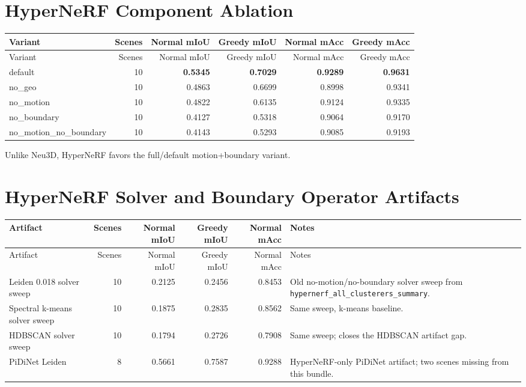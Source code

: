 \documentclass[10pt]{article}
\begin{document}
\section{HyperNeRF Component Ablation}
\small
\begin{longtable}{lrrrrr}
\toprule
Variant & Scenes & Normal mIoU & Greedy mIoU & Normal mAcc & Greedy mAcc \\
\midrule
\endfirsthead
\toprule
Variant & Scenes & Normal mIoU & Greedy mIoU & Normal mAcc & Greedy mAcc \\
\midrule
\endhead
default & 10 & \textbf{0.5345} & \textbf{0.7029} & \textbf{0.9289} & \textbf{0.9631} \\
no\_geo & 10 & 0.4863 & 0.6699 & 0.8998 & 0.9341 \\
no\_motion & 10 & 0.4822 & 0.6135 & 0.9124 & 0.9335 \\
no\_boundary & 10 & 0.4127 & 0.5318 & 0.9064 & 0.9170 \\
no\_motion\_no\_boundary & 10 & 0.4143 & 0.5293 & 0.9085 & 0.9193 \\
\bottomrule
\end{longtable}
\normalsize

Unlike Neu3D, HyperNeRF favors the full/default motion+boundary variant.

\section{HyperNeRF Solver and Boundary Operator Artifacts}
\small
\begin{longtable}{lrrrrp{5.6cm}}
\toprule
Artifact & Scenes & Normal mIoU & Greedy mIoU & Normal mAcc & Notes \\
\midrule
\endfirsthead
\toprule
Artifact & Scenes & Normal mIoU & Greedy mIoU & Normal mAcc & Notes \\
\midrule
\endhead
Leiden 0.018 solver sweep & 10 & 0.2125 & 0.2456 & 0.8453 & Old no-motion/no-boundary solver sweep from \texttt{hypernerf\_all\_clusterers\_summary}. \\
Spectral k-means solver sweep & 10 & 0.1875 & 0.2835 & 0.8562 & Same sweep, k-means baseline. \\
HDBSCAN solver sweep & 10 & 0.1794 & 0.2726 & 0.7908 & Same sweep; closes the HDBSCAN artifact gap. \\
PiDiNet Leiden & 8 & 0.5661 & 0.7587 & 0.9288 & HyperNeRF-only PiDiNet artifact; two scenes missing from this bundle. \\
\bottomrule
\end{longtable}
\normalsize
\end{document}
